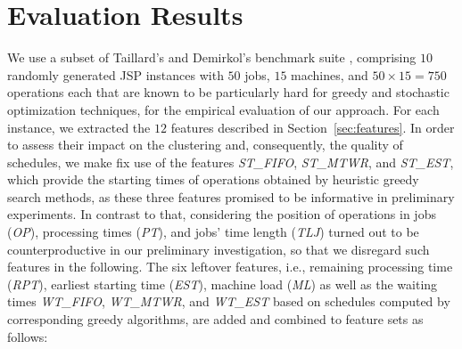 \documentclass[runningheads]{llncs}
\newcommand{\stest}{\textit{ST\_EST}\xspace}
\newcommand{\stmtwr}{\textit{ST\_MTWR}\xspace}
\newcommand{\stfifo}{\textit{ST\_FIFO}\xspace}
\newcommand{\wtest}{\textit{WT\_EST}\xspace}
\newcommand{\wtmtwr}{\textit{WT\_MTWR}\xspace}
\newcommand{\wtfifo}{\textit{WT\_FIFO}\xspace}
\begin{document}
\section{Evaluation Results}
\label{sec:eval}
We use a subset of Taillard's and Demirkol's benchmark suite \cite{taillard1993benchmarks,demirkol1998benchmarks}, comprising $10$ randomly generated JSP instances 
with $50$ jobs, $15$ machines, and $50\times 15=750$ operations each that are
known to be particularly hard for greedy and stochastic optimization techniques, for the empirical evaluation of our approach.
For each instance, we extracted the $12$ features described in Section~\ref{sec:features}. In order to assess their impact %
on the clustering and, consequently, the quality of schedules, we make fix use of the features \stfifo, \stmtwr, and \stest, which provide the starting times of operations obtained by
heuristic greedy search methods, as these three features promised to be informative
in preliminary experiments.
In contrast to that, considering the position of operations in jobs (\textit{OP}),
processing times (\textit{PT}), and jobs' time length (\textit{TLJ})
turned out to be counterproductive in our preliminary investigation,
so that we disregard such features in the following.
The six leftover features, i.e., remaining processing time (\textit{RPT}),
earliest starting time (\textit{EST}), machine load (\textit{ML})
as well as the waiting times \wtfifo, \wtmtwr, and \wtest
based on schedules computed by corresponding greedy algorithms,
are added and combined to feature sets as follows:
\end{document}
